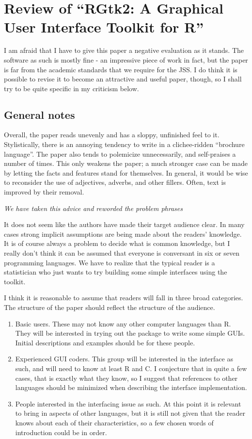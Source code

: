 \documentclass{article}
\begin{document}
\section*{Review of ``RGtk2: A Graphical User Interface Toolkit for R''}

I am afraid that I have to give this paper a negative evaluation as it stands. The
software as such is mostly fine - an impressive piece of work in fact, but the
paper is far from the academic standards that we require for the JSS. I do think
it is possible to revise it to become an attractive and useful paper, though, so I
shall try to be quite specific in my criticism below.

\subsection*{General notes}

Overall, the paper reads unevenly and has a sloppy, unfinished feel to it. Stylistically,
there is an annoying tendency to write in a clichee-ridden ``brochure
language''. The paper also tends to polemicize unnecessarily, and self-praises a
number of times. This only weakens the paper; a much stronger case can be
made by letting the facts and features stand for themselves.
In general, it would be wise to reconsider the use of adjectives, adverbs, and
other fillers. Often, text is improved by their removal.

\emph{We have taken this advice and reworded the problem phrases}

It does not seem like the authors have made their target audience clear. In many
cases strong implicit assumptions are being made about the readers' knowledge.
It is of course always a problem to decide what is common knowledge, but
I really don't think it can be assumed that everyone is conversant in six or
seven programming languages. We have to realize that the typical reader is
a statistician who just wants to try building some simple interfaces using the
toolkit.

I think it is reasonable to assume that readers will fall in three broad categories.
The structure of the paper should reflect the structure of the audience.

\begin{enumerate}
\item Basic users. These may not know any other computer languages than R.
They will be interested in trying out the package to write some simple
GUIs. Initial descriptions and examples should be for these people.
\item Experienced GUI coders. This group will be interested in the interface as
such, and will need to know at least R and C. I conjecture that in quite
a few cases, that is exactly what they know, so I suggest that references
to other languages should be minimized when describing the interface
implementation.
\item People interested in the interfacing issue as such. At this point it is relevant
to bring in aspects of other languages, but it is still not given that the
reader knows about each of their characteristics, so a few chosen words of
introduction could be in order.
\end{enumerate}
\end{document}
